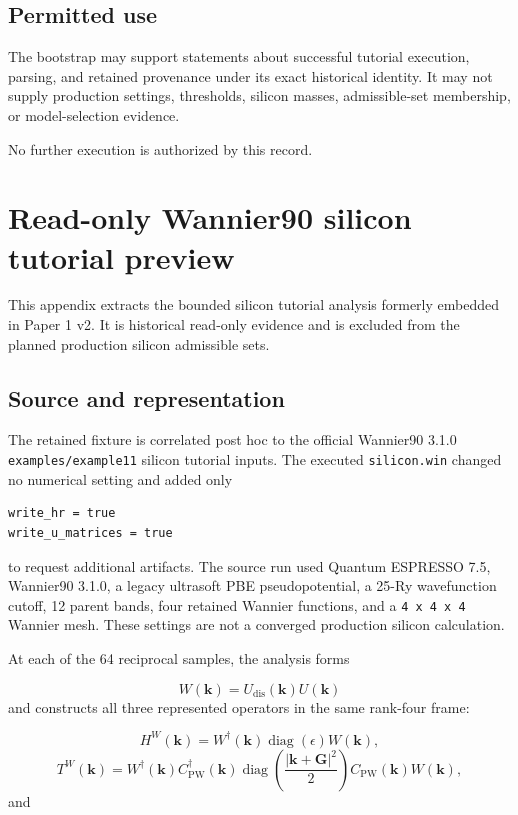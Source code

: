 \documentclass[11pt]{article}
\begin{document}
\subsection{Permitted use}
The bootstrap may support statements about successful tutorial execution, parsing, and retained provenance under its exact historical identity. It may not supply production settings, thresholds, silicon masses, admissible-set membership, or model-selection evidence.

No further execution is authorized by this record.

\clearpage
\section{Read-only Wannier90 silicon tutorial preview}\label{app:tutorial}
This appendix extracts the bounded silicon tutorial analysis formerly embedded in Paper 1 v2. It is historical read-only evidence and is excluded from the planned production silicon admissible sets.

\subsection{Source and representation}
The retained fixture is correlated post hoc to the official Wannier90 3.1.0 \texttt{examples/example11} silicon tutorial inputs. The executed \texttt{silicon.win} changed no numerical setting and added only

\begin{verbatim}
write_hr = true
write_u_matrices = true
\end{verbatim}
to request additional artifacts. The source run used Quantum ESPRESSO 7.5, Wannier90 3.1.0, a legacy ultrasoft PBE pseudopotential, a 25-Ry wavefunction cutoff, 12 parent bands, four retained Wannier functions, and a \texttt{4 x 4 x 4} Wannier mesh. These settings are not a converged production silicon calculation.

At each of the 64 reciprocal samples, the analysis forms

\begin{equation}
W(\mathbf k)=U_{\mathrm{dis}}(\mathbf k)U(\mathbf k)
\end{equation}
and constructs all three represented operators in the same rank-four frame:

\begin{equation}
H^W(\mathbf k)
=W^\dagger(\mathbf k)\operatorname{diag}(\epsilon)W(\mathbf k),
\end{equation}
\begin{equation}
T^W(\mathbf k)
=W^\dagger(\mathbf k)C_{\mathrm{PW}}^\dagger(\mathbf k)
\operatorname{diag}\!\left(\frac{|\mathbf k+\mathbf G|^2}{2}\right)
C_{\mathrm{PW}}(\mathbf k)W(\mathbf k),
\end{equation}
and
\end{document}
